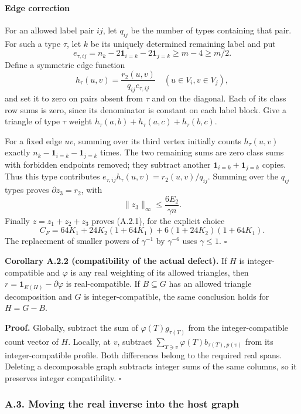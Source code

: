\documentclass[english,11pt,a4paper]{article}
\begin{document}
\paragraph{Edge correction}\label{edge-correction}

For an allowed label pair \(ij\), let \(q_{ij}\) be the number of types containing that pair. For such a type \(\tau\), let \(k\) be its uniquely determined remaining label and put \[e_{\tau,ij}=n_k-2\mathbf1_{i=k}-2\mathbf1_{j=k}\ge m-4\ge m/2.\] Define a symmetric edge function \[h_\tau(u,v)=\frac{r_2(u,v)}{q_{ij}e_{\tau,ij}}
\quad (u\in V_i,v\in V_j),\] and set it to zero on pairs absent from \(\tau\) and on the diagonal. Each of its class row sums is zero, since its denominator is constant on each label block. Give a triangle of type \(\tau\) weight \(h_\tau(a,b)+h_\tau(a,c)+h_\tau(b,c)\).

For a fixed edge \(uv\), summing over its third vertex initially counts \(h_\tau(u,v)\) exactly \(n_k-\mathbf1_{i=k}-\mathbf1_{j=k}\) times. The two remaining sums are zero class sums with forbidden endpoints removed; they subtract another \(\mathbf1_{i=k}+\mathbf1_{j=k}\) copies. Thus this type contributes \(e_{\tau,ij}h_\tau(u,v)=r_2(u,v)/q_{ij}\). Summing over the \(q_{ij}\) types proves \(\partial z_3=r_2\), with \[\|z_3\|_\infty\le\frac{6E_2}{\gamma n}.\] Finally \(z=z_1+z_2+z_3\) proves (A.2.1), for the explicit choice \[C_F=64K_1+24K_2(1+64K_1)
+6(1+24K_2)(1+64K_1).
\tag{A.2.6}\] The replacement of smaller powers of \(\gamma^{-1}\) by \(\gamma^{-6}\) uses \(\gamma\le1\). \(\square\)

\textbf{Corollary A.2.2 (compatibility of the actual defect).} If \(H\) is integer-compatible and \(\varphi\) is any real weighting of its allowed triangles, then \(r=\mathbf1_{E(H)}-\partial\varphi\) is real-compatible. If \(B\subseteq G\) has an allowed triangle decomposition and \(G\) is integer-compatible, the same conclusion holds for \(H=G-B\).

\textbf{Proof.} Globally, subtract the sum of \(\varphi(T)g_{\tau(T)}\) from the integer-compatible count vector of \(H\). Locally, at \(v\), subtract \(\sum_{T\ni v}\varphi(T)b_{\tau(T),p(v)}\) from its integer-compatible profile. Both differences belong to the required real spans. Deleting a decomposable graph subtracts integer sums of the same columns, so it preserves integer compatibility. \(\square\)

\subsubsection{A.3. Moving the real inverse into the host graph}\label{a.3.-moving-the-real-inverse-into-the-host-graph}
\end{document}
